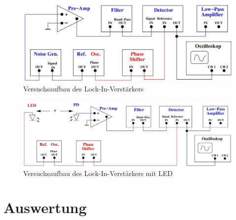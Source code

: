 \begin{figure}
    \centering
    \includegraphics[width=\linewidth]{./images/lock-in.jpg}
    \caption{Versuchsaufbau des Lock-In-Verstärkers \cite{V303}}
    \label{fig:1}
\end{figure}

\begin{figure}
    \centering
    \includegraphics[width=\linewidth]{./images/lock-in_led.jpg}
    \caption{Versuchsaufbau des Lock-In-Verstärkers mit LED \cite{V303}}
    \label{fig:2}
\end{figure}


\section{Auswertung}
\newpage

